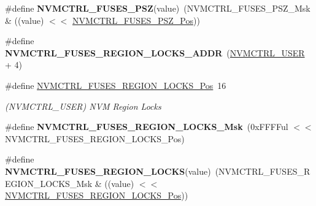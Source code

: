 \begin{DoxyCompactItemize}
\item 
\hypertarget{group__fuses__api_ga5ef4e83f041f9add8bad0103206acd30}{}\#define {\bfseries N\+V\+M\+C\+T\+R\+L\+\_\+\+F\+U\+S\+E\+S\+\_\+\+P\+S\+Z}(value)~(N\+V\+M\+C\+T\+R\+L\+\_\+\+F\+U\+S\+E\+S\+\_\+\+P\+S\+Z\+\_\+\+Msk \& ((value) $<$$<$ \hyperlink{group__fuses__api_gaea11bcd13d9dca02cf64ca6fd5d2da50}{N\+V\+M\+C\+T\+R\+L\+\_\+\+F\+U\+S\+E\+S\+\_\+\+P\+S\+Z\+\_\+\+Pos}))\label{group__fuses__api_ga5ef4e83f041f9add8bad0103206acd30}

\item 
\hypertarget{group__fuses__api_gaa6991e05f9343dab06efb7e275ab84fd}{}\#define {\bfseries N\+V\+M\+C\+T\+R\+L\+\_\+\+F\+U\+S\+E\+S\+\_\+\+R\+E\+G\+I\+O\+N\+\_\+\+L\+O\+C\+K\+S\+\_\+\+A\+D\+D\+R}~(\hyperlink{group___s_a_m_l21_j18_a__base_ga7a7a83a5753fa323b61536e396083c99}{N\+V\+M\+C\+T\+R\+L\+\_\+\+U\+S\+E\+R} + 4)\label{group__fuses__api_gaa6991e05f9343dab06efb7e275ab84fd}

\item 
\hypertarget{group__fuses__api_ga553b4d761e65080381c6af440abee0f0}{}\#define \hyperlink{group__fuses__api_ga553b4d761e65080381c6af440abee0f0}{N\+V\+M\+C\+T\+R\+L\+\_\+\+F\+U\+S\+E\+S\+\_\+\+R\+E\+G\+I\+O\+N\+\_\+\+L\+O\+C\+K\+S\+\_\+\+Pos}~16\label{group__fuses__api_ga553b4d761e65080381c6af440abee0f0}

\begin{DoxyCompactList}\small\item\em (N\+V\+M\+C\+T\+R\+L\+\_\+\+U\+S\+E\+R) N\+V\+M Region Locks \end{DoxyCompactList}\item 
\hypertarget{group__fuses__api_gad7be5211197af07d4d82363d29264bf9}{}\#define {\bfseries N\+V\+M\+C\+T\+R\+L\+\_\+\+F\+U\+S\+E\+S\+\_\+\+R\+E\+G\+I\+O\+N\+\_\+\+L\+O\+C\+K\+S\+\_\+\+Msk}~(0x\+F\+F\+F\+Ful $<$$<$ N\+V\+M\+C\+T\+R\+L\+\_\+\+F\+U\+S\+E\+S\+\_\+\+R\+E\+G\+I\+O\+N\+\_\+\+L\+O\+C\+K\+S\+\_\+\+Pos)\label{group__fuses__api_gad7be5211197af07d4d82363d29264bf9}

\item 
\hypertarget{group__fuses__api_ga61ade65b0ec65479f42594be4d9ba94f}{}\#define {\bfseries N\+V\+M\+C\+T\+R\+L\+\_\+\+F\+U\+S\+E\+S\+\_\+\+R\+E\+G\+I\+O\+N\+\_\+\+L\+O\+C\+K\+S}(value)~(N\+V\+M\+C\+T\+R\+L\+\_\+\+F\+U\+S\+E\+S\+\_\+\+R\+E\+G\+I\+O\+N\+\_\+\+L\+O\+C\+K\+S\+\_\+\+Msk \& ((value) $<$$<$ \hyperlink{group__fuses__api_ga553b4d761e65080381c6af440abee0f0}{N\+V\+M\+C\+T\+R\+L\+\_\+\+F\+U\+S\+E\+S\+\_\+\+R\+E\+G\+I\+O\+N\+\_\+\+L\+O\+C\+K\+S\+\_\+\+Pos}))\label{group__fuses__api_ga61ade65b0ec65479f42594be4d9ba94f}


\end{DoxyCompactItemize}
